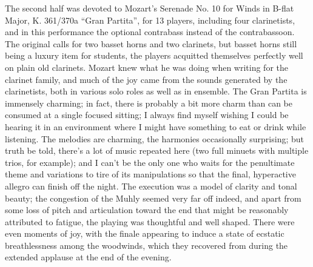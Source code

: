 The second half was devoted to Mozart’s Serenade No. 10 for Winds in B-flat Major, K. 361/370a “Gran Partita”, for 13 players, including four clarinetists, and in this performance the optional contrabass instead of the contrabassoon. The original calls for two basset horns and two clarinets, but basset horns still being a luxury item for students, the players acquitted themselves perfectly well on plain old clarinets. Mozart knew what he was doing when writing for the clarinet family, and much of the joy came from the sounds generated by the clarinetists, both in various solo roles as well as in ensemble. The Gran Partita is immensely charming; in fact, there is probably a bit more charm than can be consumed at a single focused sitting; I always find myself wishing I could be hearing it in an environment where I might have something to eat or drink while listening. The melodies are charming, the harmonies occasionally surprising; but truth be told, there’s a lot of music repeated here (two full minuets with multiple trios, for example); and I can’t be the only one who waits for the penultimate theme and variations to tire of its manipulations so that the final, hyperactive allegro can finish off the night. The execution was a model of clarity and tonal beauty; the congestion of the Muhly seemed very far off indeed, and apart from some loss of pitch and articulation toward the end that might be reasonably attributed to fatigue, the playing was thoughtful and well shaped. There were even moments of joy, with the finale appearing to induce a state of ecstatic breathlessness among the woodwinds, which they recovered from during the extended applause at the end of the evening.
